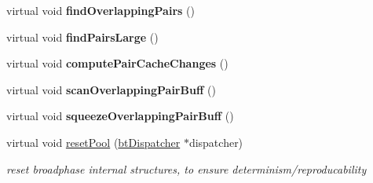 \begin{DoxyCompactItemize}
\item 
\hypertarget{classbt_cuda_broadphase_a067e6c30dbbf32a1e7b19b74ddf460f2}{virtual void {\bfseries find\+Overlapping\+Pairs} ()}\label{classbt_cuda_broadphase_a067e6c30dbbf32a1e7b19b74ddf460f2}

\item 
\hypertarget{classbt_cuda_broadphase_a5f6a023957c2009fd3318cab0e3fb2f1}{virtual void {\bfseries find\+Pairs\+Large} ()}\label{classbt_cuda_broadphase_a5f6a023957c2009fd3318cab0e3fb2f1}

\item 
\hypertarget{classbt_cuda_broadphase_a02d696847b07cd3355946f1879174186}{virtual void {\bfseries compute\+Pair\+Cache\+Changes} ()}\label{classbt_cuda_broadphase_a02d696847b07cd3355946f1879174186}

\item 
\hypertarget{classbt_cuda_broadphase_a082c3402e4406fe30d2aa417cdb58ae1}{virtual void {\bfseries scan\+Overlapping\+Pair\+Buff} ()}\label{classbt_cuda_broadphase_a082c3402e4406fe30d2aa417cdb58ae1}

\item 
\hypertarget{classbt_cuda_broadphase_a6e6029138dedf30ba98ffad87aedfbd4}{virtual void {\bfseries squeeze\+Overlapping\+Pair\+Buff} ()}\label{classbt_cuda_broadphase_a6e6029138dedf30ba98ffad87aedfbd4}

\item 
\hypertarget{classbt_cuda_broadphase_ae66b64974475ab3df0ea10c59d4bc68f}{virtual void \hyperlink{classbt_cuda_broadphase_ae66b64974475ab3df0ea10c59d4bc68f}{reset\+Pool} (\hyperlink{classbt_dispatcher}{bt\+Dispatcher} $\ast$dispatcher)}\label{classbt_cuda_broadphase_ae66b64974475ab3df0ea10c59d4bc68f}

\begin{DoxyCompactList}\small\item\em reset broadphase internal structures, to ensure determinism/reproducability \end{DoxyCompactList}\end{DoxyCompactItemize}
